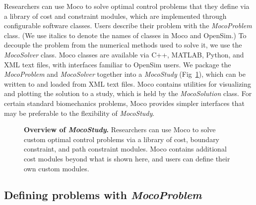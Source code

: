 \documentclass[10pt,letterpaper]{article}
\begin{document}
Researchers can use Moco to solve optimal control problems that they define via a library of cost and constraint modules, which are implemented through configurable software classes. Users describe their problem with the \textit{MocoProblem} class. (We use italics to denote the names of classes in Moco and OpenSim.) To decouple the problem from the numerical methods used to solve it, we use the \textit{MocoSolver} class. Moco classes are available via C++, MATLAB, Python, and XML text files, with interfaces familiar to OpenSim users. We package the \textit{MocoProblem} and \textit{MocoSolver} together into a \textit{MocoStudy} (Fig~\ref{mocodiagram}), which can be written to and loaded from XML text files. Moco contains utilities for visualizing and plotting the solution to a study, which is held by the \textit{MocoSolution} class. For certain standard biomechanics problems, Moco provides simpler interfaces that may be preferable to the flexibility of \textit{MocoStudy}.

\begin{figure}[!h]
\centering
    \caption{{\bf Overview of \textit{MocoStudy}.}
        Researchers can use Moco to solve custom optimal control problems via a library of cost, boundary constraint, and path constraint modules. Moco contains additional cost modules beyond what is shown here, and users can define their own custom modules.}
    \label{mocodiagram}
\end{figure}

\subsection*{Defining problems with \textit{MocoProblem}}
\end{document}

